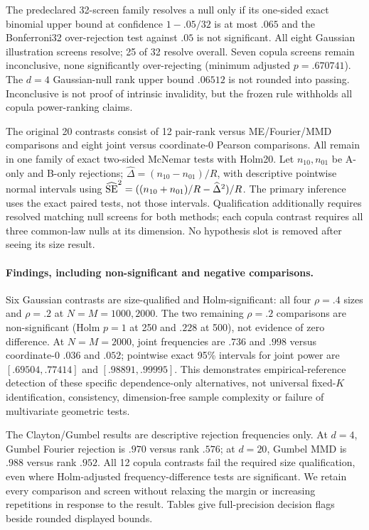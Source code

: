 The predeclared 32-screen family resolves a null only if its one-sided exact
binomial upper bound at confidence $1-.05/32$ is at most $.065$ and the
Bonferroni32 over-rejection test against $.05$ is not significant. All eight
Gaussian illustration screens resolve; 25 of 32 resolve overall. Seven copula
screens remain inconclusive, none significantly over-rejecting (minimum
adjusted $p=.670741$). The $d=4$ Gaussian-null rank upper bound $.06512$
is not rounded into passing. Inconclusive is not proof of intrinsic invalidity,
but the frozen rule withholds all copula power-ranking claims.

The original 20 contrasts consist of 12 pair-rank versus ME/Fourier/MMD
comparisons and eight joint versus coordinate-0 Pearson comparisons.
All remain in one family of exact two-sided McNemar tests with Holm20.
Let $n_{10},n_{01}$ be A-only and B-only rejections;
$\widehat\Delta=(n_{10}-n_{01})/R$, with descriptive pointwise normal intervals
using $\widehat{\rm SE}^2=((n_{10}+n_{01})/R-\widehat\Delta^2)/R$.
The primary inference uses the exact paired tests, not those intervals.
Qualification additionally requires resolved matching null screens for both
methods; each copula contrast requires all three common-law nulls at its
dimension. No hypothesis slot is removed after seeing its size result.

\paragraph{Findings, including non-significant and negative comparisons.}
Six Gaussian contrasts are size-qualified and Holm-significant: all four
$\rho=.4$ sizes and $\rho=.2$ at $N=M=1000,2000$. The two remaining
$\rho=.2$ comparisons are non-significant (Holm $p=1$ at 250 and $.228$ at
500), not evidence of zero difference. At $N=M=2000$, joint frequencies
are $.736$ and $.998$ versus coordinate-0 $.036$ and $.052$;
pointwise exact 95\% intervals for joint power are $[.69504,.77414]$ and
$[.98891,.99995]$. This demonstrates empirical-reference detection of these
specific dependence-only alternatives, not universal fixed-$K$ identification,
consistency, dimension-free sample complexity or failure of multivariate
geometric tests.

The Clayton/Gumbel results are descriptive rejection frequencies only.
At $d=4$, Gumbel Fourier rejection is $.970$ versus rank $.576$;
at $d=20$, Gumbel MMD is $.988$ versus rank $.952$.
All 12 copula contrasts fail the required size qualification, even where
Holm-adjusted frequency-difference tests are significant. We retain every
comparison and screen without relaxing the margin or increasing repetitions
in response to the result. Tables give full-precision decision flags beside
rounded displayed bounds.


